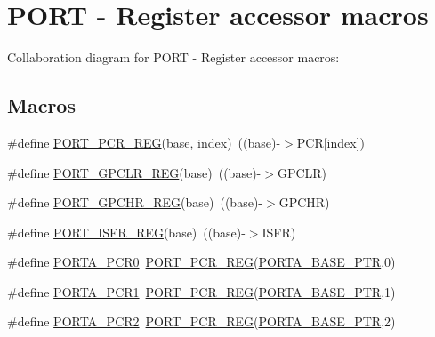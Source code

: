 \hypertarget{group___p_o_r_t___register___accessor___macros}{}\section{P\+O\+RT -\/ Register accessor macros}
\label{group___p_o_r_t___register___accessor___macros}
Collaboration diagram for P\+O\+RT -\/ Register accessor macros\+:
\subsection*{Macros}
\begin{DoxyCompactItemize}
\item 
\#define \hyperlink{group___p_o_r_t___register___accessor___macros_ga7a4a549c0ffd6b98b9fbfc0bdcfb5cea}{P\+O\+R\+T\+\_\+\+P\+C\+R\+\_\+\+R\+EG}(base,  index)~((base)-\/$>$P\+CR\mbox{[}index\mbox{]})
\item 
\#define \hyperlink{group___p_o_r_t___register___accessor___macros_ga87d8b85c821b383c37cfedaa30eeb27c}{P\+O\+R\+T\+\_\+\+G\+P\+C\+L\+R\+\_\+\+R\+EG}(base)~((base)-\/$>$G\+P\+C\+LR)
\item 
\#define \hyperlink{group___p_o_r_t___register___accessor___macros_ga5b60d88d1233de175d8e51c5b65b3ff0}{P\+O\+R\+T\+\_\+\+G\+P\+C\+H\+R\+\_\+\+R\+EG}(base)~((base)-\/$>$G\+P\+C\+HR)
\item 
\#define \hyperlink{group___p_o_r_t___register___accessor___macros_ga71010d47c68b6ac12dbc646ad2cd5a2f}{P\+O\+R\+T\+\_\+\+I\+S\+F\+R\+\_\+\+R\+EG}(base)~((base)-\/$>$I\+S\+FR)
\item 
\#define \hyperlink{group___p_o_r_t___register___accessor___macros_gaf09680dfe5ed3f1f4df46364406b5d65}{P\+O\+R\+T\+A\+\_\+\+P\+C\+R0}~\hyperlink{group___p_o_r_t___register___accessor___macros_ga7a4a549c0ffd6b98b9fbfc0bdcfb5cea}{P\+O\+R\+T\+\_\+\+P\+C\+R\+\_\+\+R\+EG}(\hyperlink{group___p_o_r_t___peripheral_gaa18ec7594fe603225220ec6eda4a19ce}{P\+O\+R\+T\+A\+\_\+\+B\+A\+S\+E\+\_\+\+P\+TR},0)
\item 
\#define \hyperlink{group___p_o_r_t___register___accessor___macros_gaa0028ded7cfc5ec26b8736ce6b6cab1d}{P\+O\+R\+T\+A\+\_\+\+P\+C\+R1}~\hyperlink{group___p_o_r_t___register___accessor___macros_ga7a4a549c0ffd6b98b9fbfc0bdcfb5cea}{P\+O\+R\+T\+\_\+\+P\+C\+R\+\_\+\+R\+EG}(\hyperlink{group___p_o_r_t___peripheral_gaa18ec7594fe603225220ec6eda4a19ce}{P\+O\+R\+T\+A\+\_\+\+B\+A\+S\+E\+\_\+\+P\+TR},1)
\item 
\#define \hyperlink{group___p_o_r_t___register___accessor___macros_ga27c656f9b2b1389be19422801b95c188}{P\+O\+R\+T\+A\+\_\+\+P\+C\+R2}~\hyperlink{group___p_o_r_t___register___accessor___macros_ga7a4a549c0ffd6b98b9fbfc0bdcfb5cea}{P\+O\+R\+T\+\_\+\+P\+C\+R\+\_\+\+R\+EG}(\hyperlink{group___p_o_r_t___peripheral_gaa18ec7594fe603225220ec6eda4a19ce}{P\+O\+R\+T\+A\+\_\+\+B\+A\+S\+E\+\_\+\+P\+TR},2)

\end{DoxyCompactItemize}
